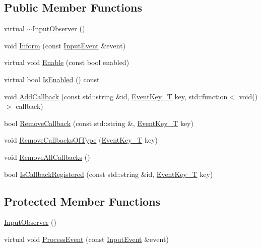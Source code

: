 \subsection*{Public Member Functions}
\begin{DoxyCompactItemize}
\item 
virtual \mbox{\hyperlink{classngl_1_1_input_observer_a0a1424516ca191ec125d99c7b49eea89}{$\sim$\+Input\+Observer}} ()
\item 
void \mbox{\hyperlink{classngl_1_1_input_observer_ae3952d18e310683a24be067ab6789dc1}{Inform}} (const \mbox{\hyperlink{structngl_1_1_input_event}{Input\+Event}} \&event)
\item 
virtual void \mbox{\hyperlink{classngl_1_1_input_observer_a2223a29f34421893ba40304cbdc5d1cf}{Enable}} (const bool enabled)
\item 
virtual bool \mbox{\hyperlink{classngl_1_1_input_observer_abef3ad4239a2d189d92997455be5aa35}{Is\+Enabled}} () const
\item 
void \mbox{\hyperlink{classngl_1_1_input_observer_ab6ebe897b73c426665ccd58548933135}{Add\+Callback}} (const std\+::string \&id, \mbox{\hyperlink{namespacengl_a5b20ff50635da5e3adb6bec00c062497}{Event\+Key\+\_\+T}} key, std\+::function$<$ void()$>$ callback)
\item 
bool \mbox{\hyperlink{classngl_1_1_input_observer_a8b5d0b434a01c53f460a81f87537e943}{Remove\+Callback}} (const std\+::string \&, \mbox{\hyperlink{namespacengl_a5b20ff50635da5e3adb6bec00c062497}{Event\+Key\+\_\+T}} key)
\item 
void \mbox{\hyperlink{classngl_1_1_input_observer_a482e5ecaaba3a05adbf5156ef2bcdc36}{Remove\+Callbacks\+Of\+Type}} (\mbox{\hyperlink{namespacengl_a5b20ff50635da5e3adb6bec00c062497}{Event\+Key\+\_\+T}} key)
\item 
void \mbox{\hyperlink{classngl_1_1_input_observer_af8452d08dab25ef2cb042165769fcc34}{Remove\+All\+Callbacks}} ()
\item 
bool \mbox{\hyperlink{classngl_1_1_input_observer_a2e1e9c403c0acd2b1c60ad35019605c5}{Is\+Callback\+Registered}} (const std\+::string \&id, \mbox{\hyperlink{namespacengl_a5b20ff50635da5e3adb6bec00c062497}{Event\+Key\+\_\+T}} key)
\end{DoxyCompactItemize}
\subsection*{Protected Member Functions}
\begin{DoxyCompactItemize}
\item 
\mbox{\hyperlink{classngl_1_1_input_observer_a51f0ac967cb709eae136014bd1d5173f}{Input\+Observer}} ()
\item 
virtual void \mbox{\hyperlink{classngl_1_1_input_observer_a10b36e303875ce065b3091a8fd805da1}{Process\+Event}} (const \mbox{\hyperlink{structngl_1_1_input_event}{Input\+Event}} \&event)
\end{DoxyCompactItemize}
